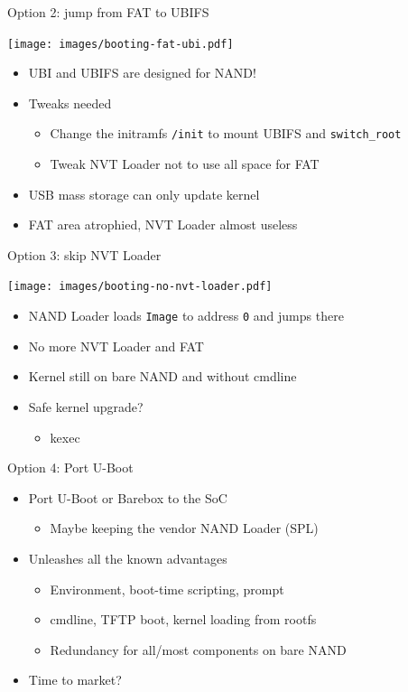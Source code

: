 \documentclass[xetex,table]{beamer}
\begin{document}
\begin{frame}{Option 2: jump from FAT to UBIFS}
  \begin{center}
    \texttt{[image: images/booting-fat-ubi.pdf]}
  \end{center}
  \begin{itemize}
  \item UBI and UBIFS are designed for NAND!
  \item Tweaks needed
    \begin{itemize}
    \item Change the initramfs \texttt{/init} to mount UBIFS and \texttt{switch\_root}
    \item Tweak NVT Loader not to use all space for FAT
    \end{itemize}
  \item USB mass storage can only update kernel
  \item FAT area atrophied, NVT Loader almost useless
  \end{itemize}
\end{frame}

\begin{frame}{Option 3: skip NVT Loader}
  \begin{center}
    \texttt{[image: images/booting-no-nvt-loader.pdf]}
  \end{center}
  \begin{itemize}
  \item NAND Loader loads \texttt{Image} to address \texttt{0} and jumps there
  \item No more NVT Loader and FAT
  \item Kernel still on bare NAND and without cmdline
  \item Safe kernel upgrade?
    \begin{itemize}
    \item kexec
    \end{itemize}
  \end{itemize}
\end{frame}

\begin{frame}{Option 4: Port U-Boot}
  \begin{itemize}
  \item Port U-Boot or Barebox to the SoC
    \begin{itemize}
    \item Maybe keeping the vendor NAND Loader (SPL)
    \end{itemize}
  \item Unleashes all the known advantages
    \begin{itemize}
    \item Environment, boot-time scripting, prompt
    \item cmdline, TFTP boot, kernel loading from rootfs
    \item Redundancy for all/most components on bare NAND
    \end{itemize}
  \item Time to market?
  \end{itemize}
\end{frame}
\end{document}
